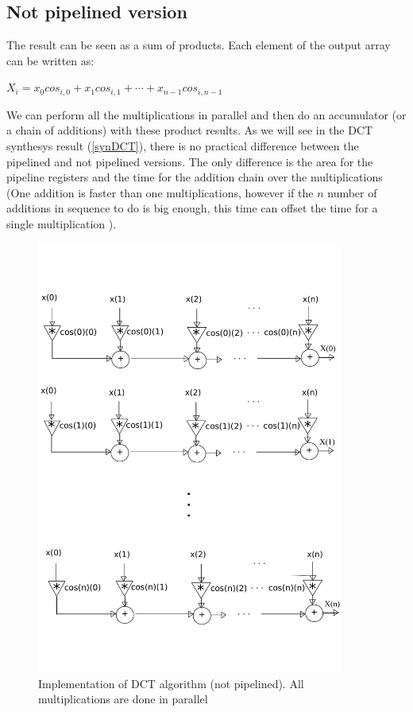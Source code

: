   \subsection{Not pipelined version}
  The result can be seen as a sum of products.
  Each element of the output array can be written as:
  \begin{center}
  	$ X_{i} =  x_{0}cos_{i,0}+x_{1}cos_{i,1}+ \cdots +x_{n-1}cos_{i,n-1}$
  \end{center}
  We can perform all the multiplications in parallel and then do an accumulator (or a chain of additions) with these product results. As we will see in the DCT synthesys result (\ref{synDCT}), there is no practical difference between the pipelined and not pipelined versions. The only difference is the area for the pipeline registers and the time for the addition chain over the multiplications (One addition is faster than one multiplications, however if the $ n $ number of additions in sequence to do is big enough, this time can offset the time for a single multiplication ).
  \begin{figure}[h!]
  	\centering	
  	\includegraphics[width=0.9\textwidth]{imm/dct/dct_nopipe.pdf}  
  	\caption{Implementation of DCT algorithm (not pipelined). All multiplications are done in parallel} 
  	\label{fig:dct_nopipe}
  \end{figure}
  \clearpage
